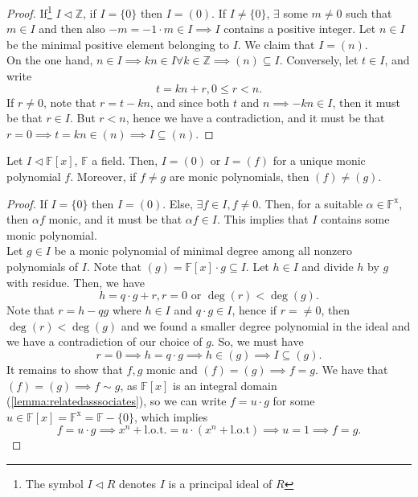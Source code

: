 \documentclass[12pt,oneside]{article}
\begin{document}
\begin{proof}
  If\footnote{The symbol $I \triangleleft R$ denotes $I$ is a principal ideal of $R$} $I \triangleleft \mathbb{Z}$, if $I = \{0\}$ then $I = (0)$. If $I \neq \{0\}$, $\exists$ some $m \neq 0$ such that $m \in I$ and then also $- m = -1 \cdot m \in I \implies I$ contains a positive integer. Let $n \in I$ be the minimal positive element belonging to $I$. We claim that $I = (n)$.\\
  On the one hand, $n \in I \implies k n \in I \forall k \in \mathbb{Z} \implies (n) \subseteq I$. Conversely, let $t \in I$, and write \[
    t = kn + r, 0 \leq r < n.  
  \]
  If $r \neq 0$, note that $r = t - kn$, and since both $t$ and $n \implies -kn \in I$, then it must be that $r \in I$. But $r < n$, hence we have a contradiction, and it must be that $r = 0 \implies t = kn \in (n) \implies I \subseteq (n)$.
\end{proof}

\begin{theorem}
  \footnotemark Let $I \triangleleft \mathbb{F}[x]$, $\mathbb{F}$ a field. Then, $I = (0)$ or $I = (f)$ for a unique monic polynomial $f$. Moreover, if $f \neq g$ are monic polynomials, then $(f) \neq (g)$.
\end{theorem}


\begin{proof}
  If $I = \{0\}$ then $I = (0)$. Else, $\exists f \in I, f \neq 0$. Then, for a suitable $\alpha \in \mathbb{F}^\text{x}$, then $\alpha f$ monic, and it must be that $\alpha f \in I$. This implies that $I$ contains some monic polynomial.\\
  Let $g \in I$ be a monic polynomial of minimal degree among all nonzero polynomials of $I$. Note that $(g) = \mathbb{F}[x]\cdot g \subseteq I$. Let $h \in I$ and divide $h$ by $g$ with residue. Then, we have \[
    h = q \cdot g + r, r = 0 \text{ or } \deg (r) < \deg (g).
  \]
  Note that $r = h - qg$ where $h \in I$ and $q\cdot g \in I$, hence if $r = \neq 0$, then $\deg(r)< \deg(g)$ and we found a smaller degree polynomial in the ideal and we have a contradiction of our choice of $g$. So, we must have \[
  r = 0 \implies h = q \cdot g \implies h \in (g) \implies I \subseteq (g).
  \]
  It remains to show that $f,g$ monic and $(f) = (g) \implies f = g$. We have that $(f) = (g) \implies f \sim g$, as $\mathbb{F}[x]$ is an integral domain (\cref{lemma:relatedasssociates}), so we can write $f = u \cdot g$ for some $u \in \mathbb{F}[x] = \mathbb{F}^\text{x}  = \mathbb{F} - \{0\}$, which implies \[
  f = u \cdot g \implies x^{n} + \text{l.o.t.} = u \cdot (x^n + \text{l.o.t})   \implies u = 1 \implies f = g.
  \]
\end{proof}
\end{document}
